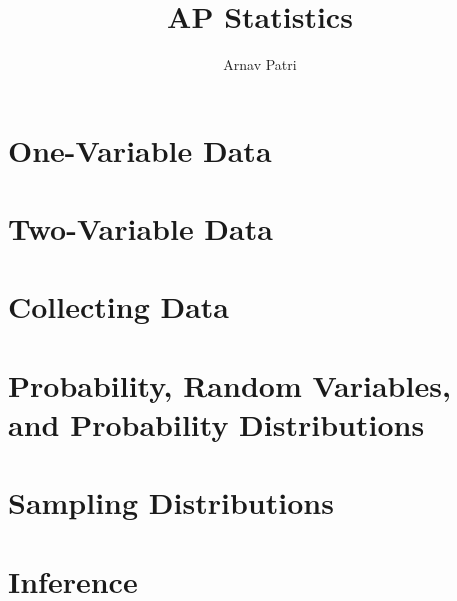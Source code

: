 \documentclass[12pt, A4]{report}
\title{AP Statistics}
\author{Arnav Patri}
\begin{document}
	\maketitle
	\tableofcontents
	\part{One-Variable Data}
		
	\part{Two-Variable Data}
		
	\part{Collecting Data}
		
	\part{Probability, Random Variables, and Probability Distributions}
		
	\part{Sampling Distributions}
		
	\part{Inference}
		
\end{document}
